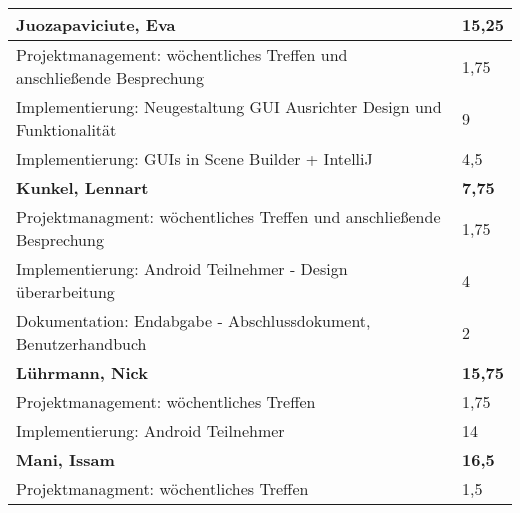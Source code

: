 \documentclass[a4paper,11pt]{scrartcl}
\begin{document}
\begin{longtable}{| p{13.8cm} | C{2.4cm} |}

	\textbf{Juozapaviciute, Eva} & \textbf{15,25}\\ %
	\hline

	Projektmanagement: wöchentliches Treffen und anschließende Besprechung
	&
	1,75
	\\
	\hline

  Implementierung: Neugestaltung GUI Ausrichter Design und Funktionalität
	&
  9
	\\
	\hline

  Implementierung: GUIs in Scene Builder + IntelliJ
	&
  4,5
	\\
	\hline
	\hline


	\textbf{Kunkel, Lennart} & \textbf{7,75}\\ %
	\hline

  Projektmanagment: wöchentliches Treffen und anschließende Besprechung
	&
  1,75
	\\
	\hline

  Implementierung: Android Teilnehmer - Design überarbeitung
	&
  4
	\\
	\hline

  Dokumentation: Endabgabe - Abschlussdokument, Benutzerhandbuch
	&
  2
	\\
	\hline
	\hline


	\textbf{Lührmann, Nick} & \textbf{15,75}\\ %
	\hline

	Projektmanagement: wöchentliches Treffen
	&
	1,75
	\\
	\hline

	Implementierung: Android Teilnehmer
	&
  14
	\\
	\hline
	\hline


	\textbf{Mani, Issam} & \textbf{16,5}\\ %
	\hline

  Projektmanagment: wöchentliches Treffen
	&
  1,5
	\\
	\hline


\end{longtable}
\end{document}
